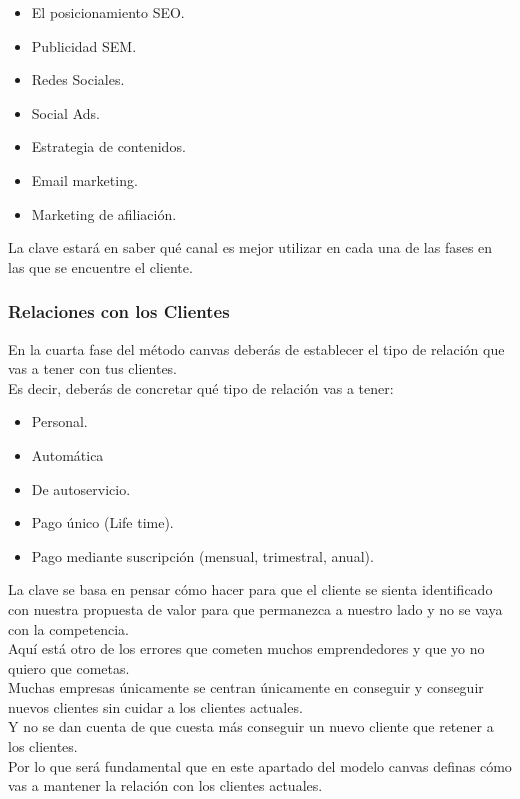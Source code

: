 \documentclass[preprint,12pt]{elsarticle}
\begin{document}
\begin{itemize}
\item El posicionamiento SEO.
\item Publicidad SEM.
\item Redes Sociales.
\item Social Ads.
\item Estrategia de contenidos.
\item Email marketing.
\item Marketing de afiliación.
\end{itemize}
La clave estará en saber qué canal es mejor utilizar en cada una de las fases en las que se encuentre el cliente.


\subsubsection{Relaciones con los Clientes}
En la cuarta fase del método canvas deberás de establecer el tipo de relación que vas a tener con tus clientes.\\
Es decir, deberás de concretar qué tipo de relación vas a tener:\\
\begin{itemize}
\item Personal.
\item Automática
\item De autoservicio.
\item Pago único (Life time).
\item Pago mediante suscripción (mensual, trimestral, anual).

\end{itemize}

La clave se basa en pensar cómo hacer para que el cliente se sienta identificado con nuestra propuesta de valor para que permanezca a nuestro lado y no se vaya con la competencia.\\

Aquí está otro de los errores que cometen muchos emprendedores y que yo no quiero que cometas.\\

Muchas empresas únicamente se centran únicamente en conseguir y conseguir nuevos clientes sin cuidar a los clientes actuales.\\

Y no se dan cuenta de que cuesta más conseguir un nuevo cliente que retener a los clientes.\\

Por lo que será fundamental que en este apartado del modelo canvas definas cómo vas a mantener la relación con los clientes actuales.\\
\end{document}
